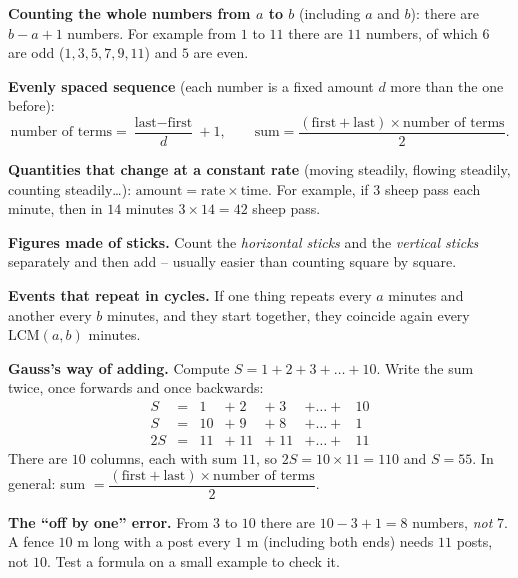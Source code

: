 \begin{knowbox}
\textbf{Counting the whole numbers from $a$ to $b$} (including $a$ and $b$): there are $b-a+1$ numbers. For example from $1$ to $11$ there are $11$ numbers, of which $6$ are odd ($1,3,5,7,9,11$) and $5$ are even.

\medskip
\textbf{Evenly spaced sequence} (each number is a fixed amount $d$ more than the one before):
\[
\text{number of terms}=\frac{\text{last}-\text{first}}{d}+1,\qquad
\text{sum}=\frac{(\text{first}+\text{last})\times\text{number of terms}}{2}.
\]

\textbf{Quantities that change at a constant rate} (moving steadily, flowing steadily, counting steadily\ldots):
$\text{amount}=\text{rate}\times\text{time}$. For example, if $3$ sheep pass each minute, then in $14$ minutes $3\times14=42$ sheep pass.

\medskip
\textbf{Figures made of sticks.} Count the \emph{horizontal sticks} and the \emph{vertical sticks} separately and then add -- usually easier than counting square by square.

\medskip
\textbf{Events that repeat in cycles.} If one thing repeats every $a$ minutes and another every $b$ minutes, and they start together, they coincide again every $\text{LCM}(a,b)$ minutes.
\end{knowbox}

\begin{proofbox}
\textbf{Gauss's way of adding.} Compute $S=1+2+3+\dots+10$. Write the sum twice, once forwards and once backwards:
\[
\begin{array}{rcccccc}
S&=&1&+\;2&+\;3&+\dots+&10\\
S&=&10&+\;9&+\;8&+\dots+&1\\ \hline
2S&=&11&+\;11&+\;11&+\dots+&11
\end{array}
\]
There are $10$ columns, each with sum $11$, so $2S=10\times11=110$ and $S=55$. In general: sum $=\dfrac{(\text{first}+\text{last})\times\text{number of terms}}{2}$.
\end{proofbox}

\begin{warnbox}
\textbf{The ``off by one'' error.} From $3$ to $10$ there are $10-3+1=8$ numbers, \emph{not} $7$. A fence $10$ m long with a post every $1$ m (including both ends) needs $11$ posts, not $10$. Test a formula on a small example to check it.
\end{warnbox}

